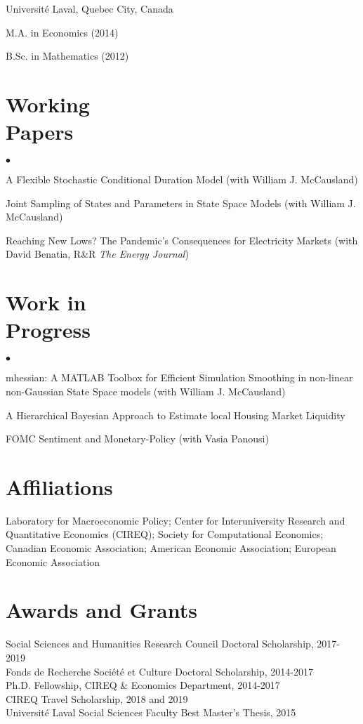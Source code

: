 \documentclass[margin,line]{res}
\newenvironment{list1}{
  \begin{list}{}{%
      \setlength{\itemsep}{.0in}
      \setlength{\parsep}{0in} \setlength{\parskip}{0in}
      \setlength{\topsep}{0in} \setlength{\partopsep}{0in} 
      \setlength{\leftmargin}{0.2in}}}{\end{list}}
\newenvironment{list2}{
  \begin{list}{$\bullet$}{%
      \setlength{\itemsep}{0in}
      \setlength{\parsep}{0in} \setlength{\parskip}{0in}
      \setlength{\topsep}{0in} \setlength{\partopsep}{0in} 
      \setlength{\leftmargin}{0.17in}}}{\end{list}}
\begin{document}
\begin{resume}
Universit\'e Laval, Quebec City, Canada \\
 \vspace*{-.15in}
\begin{list1}
\item[] M.A. in Economics (2014)
\item[] B.Sc. in Mathematics (2012)
\end{list1}


\section{\sc Working \\Papers}
\begin{list2}
  \item A Flexible Stochastic Conditional Duration Model (with William J. McCausland)
  \item Joint Sampling of States and Parameters in State Space Models (with William J. McCausland)
  \item Reaching New Lows? The Pandemic's Consequences for Electricity Markets (with David Benatia, R\&R \textit{The Energy Journal})
\end{list2}


\section{\sc Work in \\Progress}
\begin{list2}
  \item mhessian: A MATLAB Toolbox for Efficient Simulation Smoothing in non-linear non-Gaussian State Space models (with William J. McCausland)
  \item A Hierarchical Bayesian Approach to Estimate local Housing Market Liquidity
  \item FOMC Sentiment and Monetary-Policy (with Vasia Panousi) 
\end{list2}


\section{\sc Affiliations}
Laboratory for Macroeconomic Policy; Center for Interuniversity Research and Quantitative Economics (CIREQ); Society for Computational Economics; Canadian Economic Association; American Economic Association; European Economic Association


\section{\sc Awards and Grants}
Social Sciences and Humanities Research Council Doctoral Scholarship, 2017-2019\\
Fonds de Recherche Soci\'et\'e et Culture Doctoral Scholarship, 2014-2017\\
Ph.D. Fellowship, CIREQ \& Economics Department, 2014-2017\\
CIREQ Travel Scholarship, 2018 and 2019\\
Universit\'e Laval Social Sciences Faculty Best Master's Thesis, 2015




\end{resume}
\end{document}
